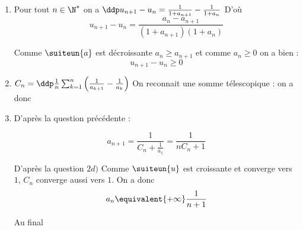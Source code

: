 \documentclass[a4paper, 11pt,reqno]{article}
\begin{document}
\begin{correction}
\begin{enumerate}
\begin{enumerate}
\item Pour tout $n\in \N^*$ on a $\ddp u_{n+1}-u_n= \frac{1}{1+a_{n+1}}- \frac{1}{1+a_n}$
D'où $$ u_{n+1}-u_n  = \frac{a_n-a_{n+1}}{(1+a_{n+1})(1+a_{n})}$$

Comme $\suiteun{a}$  est décroissante $a_n\geq a_{n+1}$ et comme $a_n\geq 0$ on  a bien : 
$$u_{n+1}-u_n\geq 0$$


\item $C_n =\ddp \frac{1}{n }\sum_{k=1}^n \left(\frac{1}{a_{k+1}} -\frac{1}{a_k} \right)$
On reconnait une somme télescopique : on a donc 



\item D'après la question précédente : 

$$a_{n+1} = \frac{1}{C_n +\frac{1}{a_1}}= \frac{1}{nC_n +1}$$

D'après la question $2d)$ Comme $\suiteun{u}$ est croissante et converge  vers $1$, $C_n$ converge aussi vers $1$. 
On a donc $$a_n \equivalent{+\infty} \frac{1}{n+1}$$

Au final 

\end{enumerate}
\end{enumerate}
\end{correction}
\end{document}
